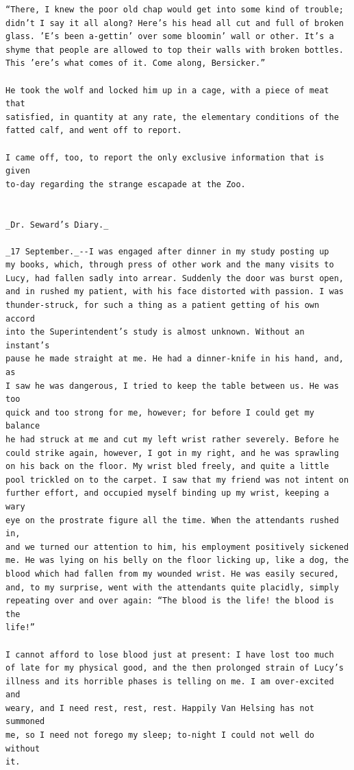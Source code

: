 \documentclass{article}
\begin{document}
\begin{verbatim}
“There, I knew the poor old chap would get into some kind of trouble;
didn’t I say it all along? Here’s his head all cut and full of broken
glass. ’E’s been a-gettin’ over some bloomin’ wall or other. It’s a
shyme that people are allowed to top their walls with broken bottles.
This ’ere’s what comes of it. Come along, Bersicker.”

He took the wolf and locked him up in a cage, with a piece of meat that
satisfied, in quantity at any rate, the elementary conditions of the
fatted calf, and went off to report.

I came off, too, to report the only exclusive information that is given
to-day regarding the strange escapade at the Zoo.


_Dr. Seward’s Diary._

_17 September._--I was engaged after dinner in my study posting up
my books, which, through press of other work and the many visits to
Lucy, had fallen sadly into arrear. Suddenly the door was burst open,
and in rushed my patient, with his face distorted with passion. I was
thunder-struck, for such a thing as a patient getting of his own accord
into the Superintendent’s study is almost unknown. Without an instant’s
pause he made straight at me. He had a dinner-knife in his hand, and, as
I saw he was dangerous, I tried to keep the table between us. He was too
quick and too strong for me, however; for before I could get my balance
he had struck at me and cut my left wrist rather severely. Before he
could strike again, however, I got in my right, and he was sprawling
on his back on the floor. My wrist bled freely, and quite a little
pool trickled on to the carpet. I saw that my friend was not intent on
further effort, and occupied myself binding up my wrist, keeping a wary
eye on the prostrate figure all the time. When the attendants rushed in,
and we turned our attention to him, his employment positively sickened
me. He was lying on his belly on the floor licking up, like a dog, the
blood which had fallen from my wounded wrist. He was easily secured,
and, to my surprise, went with the attendants quite placidly, simply
repeating over and over again: “The blood is the life! the blood is the
life!”

I cannot afford to lose blood just at present: I have lost too much
of late for my physical good, and the then prolonged strain of Lucy’s
illness and its horrible phases is telling on me. I am over-excited and
weary, and I need rest, rest, rest. Happily Van Helsing has not summoned
me, so I need not forego my sleep; to-night I could not well do without
it.



\end{verbatim}
\end{document}

